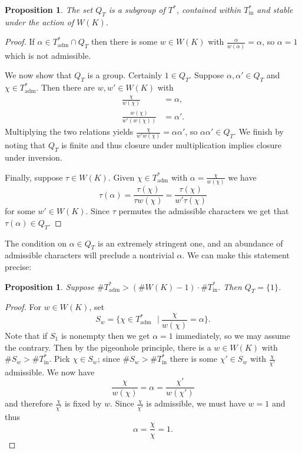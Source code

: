 \documentclass{compositio}
\theoremstyle{plain}
\newtheorem{proposition}[theorem]{Proposition}
\theoremstyle{definition}
\numberwithin{equation}{section}
\newcommand{\st}{\ensuremath{\ \ \ \vert\ }}
\newcommand{\Thadm}{T^*_{\operatorname{adm}}}
\newcommand{\Thinadm}{T^*_{\operatorname{in}}}
\newcommand{\hatT}{T^*}
\begin{document}
\begin{proposition} \label{irr-sub}
The set $Q_T$ is a subgroup of $\hatT$, contained within $\Thinadm$ and stable under the action of $W(K)$.
\end{proposition}
\begin{proof}
If $\alpha \in \Thadm \cap Q_T$ then there is some $w \in W(K)$ with
$\frac{\alpha}{w(\alpha)} = \alpha$, so $\alpha = 1$ which is not admissible.

We now show that $Q_T$ is a group.  Certainly $1 \in Q_T$.  Suppose
$\alpha, \alpha' \in Q_T$ and $\chi \in \Thadm$.  Then there are $w, w' \in W(K)$ with
\begin{align*}
\frac{\chi}{w(\chi)} &= \alpha, \\
\frac{w(\chi)}{w'(w(\chi))} &= \alpha'.
\end{align*}
Multiplying the two relations yields $\frac{\chi}{w'w(\chi)} = \alpha\alpha'$, so
$\alpha\alpha' \in Q_T$.  We finish by noting that $Q_T$ is finite and thus closure under
multiplication implies closure under inversion.

Finally, suppose $\tau \in W(K)$.  Given $\chi \in \Thadm$ with $\alpha = \frac{\chi}{w(\chi)}$ we have
$$\tau(\alpha) = \frac{\tau(\chi)}{\tau w(\chi)} = \frac{\tau(\chi)}{w' \tau(\chi)}$$
for some $w' \in W(K)$.  Since $\tau$ permutes the admissible characters we get that $\tau(\alpha) \in Q_T$.
\end{proof}

The condition on $\alpha \in Q_T$ is an extremely stringent one, and an abundance of admissible
characters will preclude a nontrivial $\alpha$.  We can make this statement precise:

\begin{proposition} \label{pigeonhole}
Suppose $\#\Thadm > (\# W(K) - 1) \cdot \# \Thinadm$.  Then $Q_T = \{ 1 \}$.
\end{proposition}
\begin{proof}
For $w \in W(K)$, set
$$S_w = \{\chi \in \Thadm \st  \frac{\chi}{w(\chi)} = \alpha\}.$$
Note that if $S_1$ is nonempty then we get $\alpha = 1$ immediately, so we may
assume the contrary.  Then by the pigeonhole principle, there is a $w \in W(K)$
with $\# S_w > \# \Thinadm$.  Pick $\chi \in S_w$; since $\# S_w > \#\Thinadm$
there is some $\chi' \in S_w$ with $\frac{\chi}{\chi'}$ admissible.  We now have
$$\frac{\chi}{w(\chi)} = \alpha = \frac{\chi'}{w(\chi')}$$
and therefore $\frac{\chi}{\chi'}$ is fixed by $w$.  Since $\frac{\chi}{\chi'}$ is admissible, we must have $w = 1$ and thus
$$\alpha = \frac{\chi}{\chi} = 1.$$
\end{proof}
\end{document}
